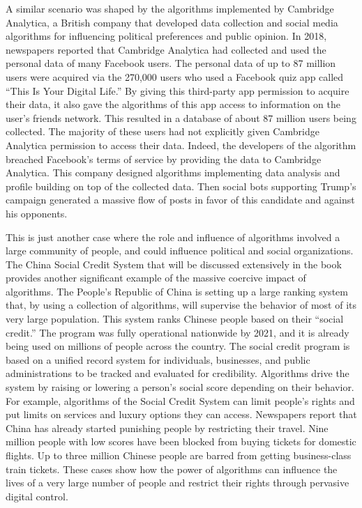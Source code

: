 A similar scenario was shaped by the algorithms implemented by Cambridge Analytica, a British company that developed data collection and social media algorithms for influencing political preferences and public opinion. In 2018, \hbox{newspapers} reported that Cambridge Analytica had collected and used the personal data of many Facebook users. The personal data of up to 87 million users were acquired via the 270,000 users who used a Facebook quiz app called ``This Is Your Digital Life.'' By giving this third-party app permission to acquire their data, it also gave the algorithms of this app access to information on the user's friends network. This resulted in a database of about 87 million users being collected. The majority of these users had not explicitly given Cambridge Analytica permission to access their data. Indeed, the developers of the algorithm breached Facebook's terms of service by providing the data to Cambridge Analytica. This company designed algorithms implementing data analysis and profile building on top of the collected data. Then social bots supporting Trump's campaign generated a massive flow of posts in favor of this candidate and against his opponents.

This is just another case where the role and influence of algorithms involved a large community of people, and could influence political and social organizations. The China Social Credit System that will be discussed extensively in the book provides another significant example of the massive coercive impact of algorithms. The People's Republic of China is setting up a large ranking system that, by using a collection of algorithms, will supervise the behavior of most of its very large population. This system ranks Chinese people based on their ``social credit.'' The program was fully operational nationwide by 2021, and it is already being used on millions of people across the country. The social credit program is based on a unified record system for individuals, businesses, and public administrations to be tracked and evaluated for credibility. Algorithms drive the system by raising or \hbox{lowering} a person's social score depending on their behavior. For example, algorithms of the Social Credit System can limit people's rights and put limits on services and luxury options they can access. Newspapers report that China has already started punishing people by restricting their travel. Nine million people with low scores have been blocked from buying tickets for domestic flights. Up to three million Chinese people are barred from getting business-class train tickets. These cases show how the power of algorithms can influence the lives of a very large number of people and restrict their rights through pervasive digital control.


